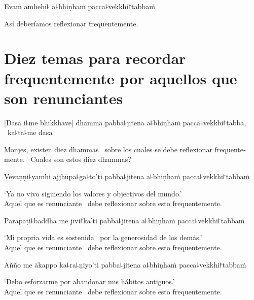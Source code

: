 Evaṁ amhehi꜕ a꜕bhiṇhaṁ pacca꜕vekkhi꜓tabbaṁ

\begin{english}
  Así deberíamos reflexionar frequentemente.
\end{english}

\chapter[Diez temas]{Diez temas para recordar frequentemente por aquellos que son renunciantes}


\begin{leader}
\end{leader}

[Dasa i꜕me bhikkhave] dhammā pabba꜕jitena a꜕bhiṇhaṁ pacca꜕vekkhi꜓tabbā, \pause\ ka꜕ta꜕me dasa

\begin{english}
  Monjes, existen diez dhammas \pause\ sobre los cuales se debe reflexionar frequentemente. \pause\ Cuales son estos diez dhammas?
\end{english}

Vevaṇṇi꜕yamhi ajjhūpa꜕ga꜕to'ti pabba꜕jitena a꜕bhiṇhaṁ pacca꜕vekkhi꜓tabbaṁ

\begin{english}
  `Ya no vivo siguiendo los valores y objectivos del mundo.' \pause\\
  Aquel que es renunciante \pause\ debe reflexionar sobre esto frequentemente.
\end{english}

Parapaṭi꜕baddhā me jīvi꜓kā'ti pabba꜕jitena a꜕bhiṇhaṁ pacca꜕vekkhi꜓tabbaṁ

\begin{english}
  `Mi propria vida es sostenida \pause\ por la generosidad de los demás.' \pause\\
  Aquel que es renunciante \pause\ debe reflexionar sobre esto frequentemente.
\end{english}

Añño me ākappo ka꜕ra꜕ṇīyo'ti pabba꜕jitena a꜕bhiṇhaṁ pacca꜕vekkhi꜓tabbaṁ

\begin{english}
  `Debo esforzarme por abandonar mis hábitos antiguos.' \pause\\
  Aquel que es renunciante \pause\ debe reflexionar sobre esto frequentemente.
\end{english}

